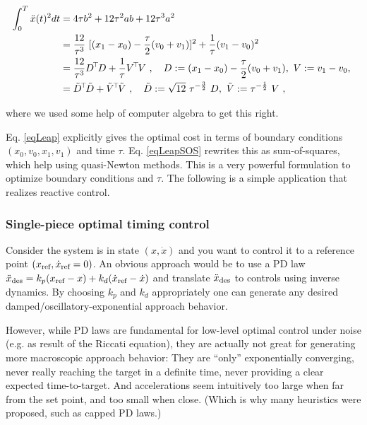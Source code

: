 \begin{align}
\int_0^T \ddot x(t)^2 dt
&= 4 \tau b^2  + 12 \tau^2 ab + 12 \tau^3 a^2 \\
&= \frac{12}{\tau^3}~[(x_1 - x_0)-\frac{\tau}{2}(v_0+v_1)]^2+\frac{1}{\tau}(v_1-v_0)^2 \label{eqLeap}\\
&= \frac{12}{\tau^3} D^\T D + \frac{1}{\tau} V^\T V \comma D := (x_1 - x_0)-\frac{\tau}{2}(v_0+v_1),~ V:=v_1-v_0,~ \\
&= \tilde D^\T \tilde D + \tilde V^\T \tilde V \comma
\tilde D := \sqrt{12}~ \tau^{-\frac{3}{2}}~ D,~ \tilde V := \tau^{-\half}~ V ~,
\label{eqLeapSOS}
\end{align}

where we used some help of computer algebra to get this right.

Eq. \eqref{eqLeap} explicitly gives the optimal cost in terms of
boundary conditions $(x_0,v_0,x_1,v_1)$ and time $\tau$.
Eq. \eqref{eqLeapSOS} rewrites this as sum-of-squares, which help
using quasi-Newton methods. This is a very powerful formulation to optimize boundary conditions and $\tau$. The following is a simple application that realizes reactive control.

\subsubsection{Single-piece optimal timing control}

Consider the system is in state $(x,\dot x)$ and you want to control it to a reference point $(x_{\text{ref}}, \dot x_{\text{ref}}=0)$. An obvious approach would be to use a PD law $\ddot x_{\text{des}} = k_p (x_{\text{ref}} - x) + k_d (\dot x_{\text{ref}} - \dot x)$ and translate $\ddot x_{\text{des}}$ to controls using inverse dynamics. By choosing $k_p$ and $k_d$ appropriately one can generate any desired damped/oscillatory-exponential approach behavior.

However, while PD laws are fundamental for low-level optimal control
under noise (e.g. as result of the Riccati equation), they are
actually not great for generating more macroscopic approach behavior:
They are ``only'' exponentially converging, never really reaching the
target in a definite time, never providing a clear expected
time-to-target. And accelerations seem intuitively too large when far
from the set point, and too small when close. (Which is why many
heuristics were proposed, such as capped PD laws.)

